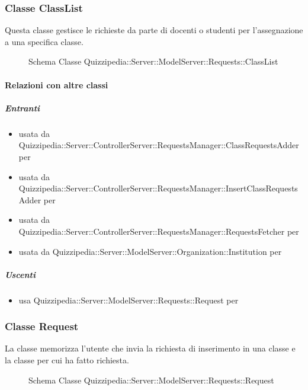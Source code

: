 \subsubsection{Classe ClassList}
Questa classe gestisce le richieste da parte di docenti o studenti per l'assegnazione a una specifica classe.
\begin{figure}[H]
\centering
\noindent{}
\caption[Schema Classe ClassList]{Schema Classe Quizzipedia::Server::ModelServer::Requests::ClassList}
\end{figure}
\paragraph{Relazioni con altre classi}
\subparagraph{Entranti}
\begin{itemize}
\item usata da Quizzipedia::Server::ControllerServer::RequestsManager::ClassRequestsAdder per 
\item usata da Quizzipedia::Server::ControllerServer::RequestsManager::InsertClassRequestsAdder per 
\item usata da Quizzipedia::Server::ControllerServer::RequestsManager::RequestsFetcher per 
\item usata da Quizzipedia::Server::ModelServer::Organization::Institution per 
\end{itemize}
\subparagraph{Uscenti}
\begin{itemize}
\item usa Quizzipedia::Server::ModelServer::Requests::Request per 
\end{itemize}
\subsubsection{Classe Request}
La classe memorizza l'utente che invia la richiesta di inserimento in una classe e la classe per cui ha fatto richiesta.
\begin{figure}[H]
\centering
\noindent{}
\caption[Schema Classe Request]{Schema Classe Quizzipedia::Server::ModelServer::Requests::Request}
\end{figure}
